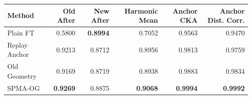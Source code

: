 \begin{tabular}{lrrrrr}
\toprule
Method & Old After & New After & Harmonic Mean & Anchor CKA & Anchor Dist. Corr.\\
\midrule
Plain FT & 0.5800 & \textbf{0.8994} & 0.7052 & 0.9563 & 0.9470\\
Replay Anchor & 0.9213 & 0.8712 & 0.8956 & 0.9813 & 0.9759\\
Old Geometry & 0.9169 & 0.8719 & 0.8938 & 0.9883 & 0.9834\\
SPMA-OG & \textbf{0.9269} & 0.8875 & \textbf{0.9068} & \textbf{0.9994} & \textbf{0.9992}\\
\bottomrule
\end{tabular}
